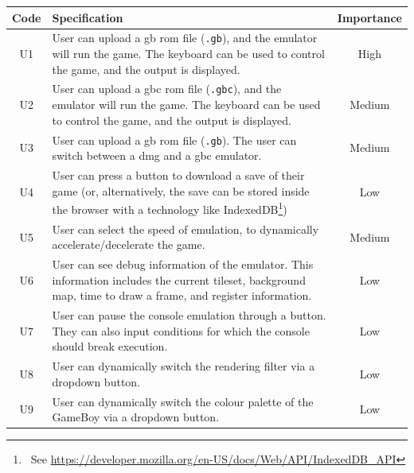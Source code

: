 \documentclass[11pt]{informatics-report}
\newcommand{\ftnt}[1]{\footnote{~See \url{#1}}}
\begin{document}
\begin{xltabular}{\textwidth}{|c|X|c|}
    \hline
    \textbf{Code} & \textbf{Specification} & \textbf{Importance}\\
    \hline\hline
    \endhead

    U1 & User can upload a \gls{gb} \gls{rom} file (\texttt{.gb}), and the emulator will run the game. The keyboard can be used to control the game, and the output is displayed. & High \\ \hline
    U2 & User can upload a \gls{gbc} \gls{rom} file (\texttt{.gbc}), and the emulator will run the game. The keyboard can be used to control the game, and the output is displayed. & Medium \\ \hline
    U3 & User can upload a \gls{gb} \gls{rom} file (\texttt{.gb}). The user can switch between a \gls{dmg} and a \gls{gbc} emulator. & Medium \\ \hline
    U4 & User can press a button to download a save of their game (or, alternatively, the save can be stored inside the browser with a technology like IndexedDB\ftnt{https://developer.mozilla.org/en-US/docs/Web/API/IndexedDB_API}) & Low \\ \hline
    U5 & User can select the speed of emulation, to dynamically accelerate/decelerate the game. & Medium \\ \hline
    U6 & User can see debug information of the emulator. This information includes the current tileset, background map, time to draw a frame, and register information. & Low \\ \hline
    U7 & User can pause the console emulation through a button. They can also input conditions for which the console should break execution. & Low \\ \hline
    U8 & User can dynamically switch the rendering filter via a dropdown button. & Low \\ \hline
    U9 & User can dynamically switch the colour palette of the GameBoy via a dropdown button. & Low \\ \hline


\end{xltabular}
\end{document}
